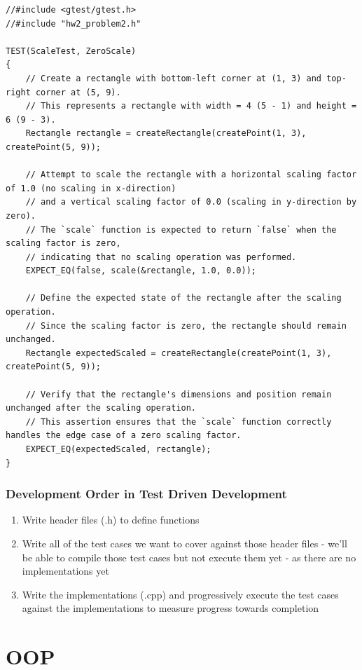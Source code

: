 \documentclass{report}
\begin{document}
\begin{verbatim}
//#include <gtest/gtest.h>
//#include "hw2_problem2.h"

TEST(ScaleTest, ZeroScale)
{
    // Create a rectangle with bottom-left corner at (1, 3) and top-right corner at (5, 9).
    // This represents a rectangle with width = 4 (5 - 1) and height = 6 (9 - 3).
    Rectangle rectangle = createRectangle(createPoint(1, 3), createPoint(5, 9));

    // Attempt to scale the rectangle with a horizontal scaling factor of 1.0 (no scaling in x-direction)
    // and a vertical scaling factor of 0.0 (scaling in y-direction by zero).
    // The `scale` function is expected to return `false` when the scaling factor is zero,
    // indicating that no scaling operation was performed.
    EXPECT_EQ(false, scale(&rectangle, 1.0, 0.0));

    // Define the expected state of the rectangle after the scaling operation.
    // Since the scaling factor is zero, the rectangle should remain unchanged.
    Rectangle expectedScaled = createRectangle(createPoint(1, 3), createPoint(5, 9));

    // Verify that the rectangle's dimensions and position remain unchanged after the scaling operation.
    // This assertion ensures that the `scale` function correctly handles the edge case of a zero scaling factor.
    EXPECT_EQ(expectedScaled, rectangle);
}
\end{verbatim}

\subsection{Development Order in Test Driven Development}

\begin{enumerate}
	\item Write header files (.h) to define functions
	\item Write all of the test cases we want to cover against
	      those header files - we’ll be able to compile those test
	      cases but not execute them yet - as there are no
	      implementations yet
	\item Write the implementations (.cpp) and progressively
	      execute the test cases against the implementations to
	      measure progress towards completion
\end{enumerate}

\chapter{OOP}
\end{document}
